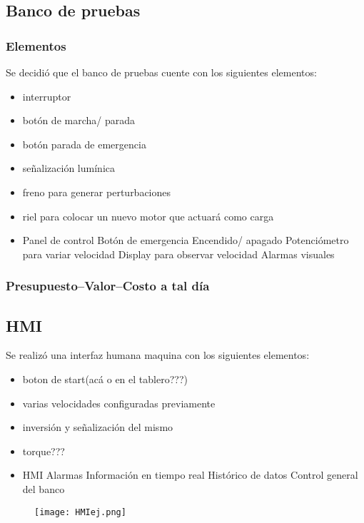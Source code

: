 \subsection{Banco de pruebas}
\subsubsection{Elementos}
Se decidió que el banco de pruebas cuente con los siguientes elementos:
\begin{itemize}
	\item interruptor
	\item botón de marcha/ parada
	\item botón parada de emergencia
	\item señalización lumínica
	\item freno para generar perturbaciones 
	\item riel para colocar un nuevo motor que actuará como carga
	\item Panel de control
		\subitem Botón de emergencia
		\subitem Encendido/ apagado
		\subitem Potenciómetro para variar velocidad
		\subitem Display para observar velocidad
		\subitem Alarmas visuales
\end{itemize}
\subsubsection{Presupuesto--Valor--Costo a tal día}
\subsection{HMI}

Se realizó una interfaz humana maquina con los siguientes elementos:
	\begin{itemize}
		\item boton de start(acá o en el tablero???)
		\item varias velocidades configuradas previamente
		\item inversión y señalización del mismo
		\item torque???
		\item HMI
        	\subitem Alarmas
       		\subitem Información en tiempo real
        	\subitem Histórico de datos
        	\subitem Control general del banco
	\end{itemize}
	\begin{figure}[htb]
		\centering
		\texttt{[image: HMIej.png]}
	\end{figure}

\newpage